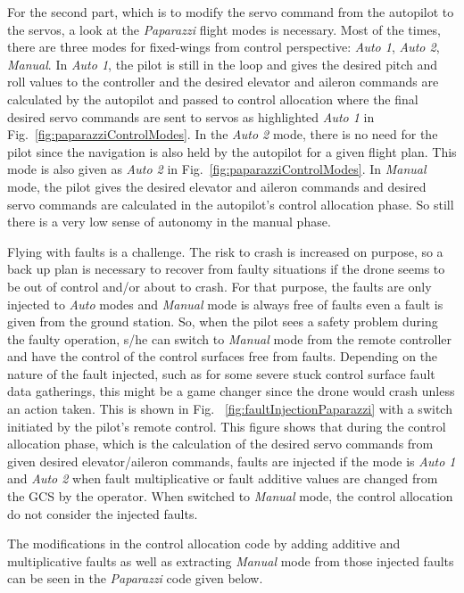 For the second part, which is to modify the servo command from the autopilot to the servos, a look at the \emph{Paparazzi} flight modes is necessary. 
Most of the times, there are three modes for fixed-wings from control perspective:  \emph{Auto 1},  \emph{Auto 2},  \emph{Manual}. 
In  \emph{Auto 1}, the pilot is still in the loop and gives the desired pitch and roll values to the controller and the desired elevator and aileron commands are calculated by the autopilot and passed to control allocation where the final desired servo commands are sent to servos as highlighted  \emph{Auto 1} in Fig.~\ref{fig:paparazziControlModes}. 
In the  \emph{Auto 2} mode, there is no need for the pilot since the navigation is also held by the autopilot for a given flight plan. 
This mode is also given as  \emph{Auto 2} in Fig.~\ref{fig:paparazziControlModes}.
In  \emph{Manual} mode, the pilot gives the desired elevator and aileron commands and desired servo commands are calculated in the autopilot's control allocation phase. So still there is a very low sense of autonomy in the manual phase. 

Flying with faults is a challenge. 
The risk to crash is increased on purpose, so a back up plan is necessary to recover from faulty situations if the drone seems to be out of control and/or about to crash. 
For that purpose, the faults are only injected to \emph{Auto} modes and \emph{Manual} mode is always free of faults even a fault is given from the ground station. 
So, when the pilot sees a safety problem during the faulty operation, s/he can switch to \emph{Manual} mode from the remote controller and have the control of the control surfaces free from faults. 
Depending on the nature of the fault injected, such as for some severe stuck control surface fault data gatherings, this might be a game changer since the drone would crash unless an action taken.  
This is shown in Fig. ~\ref{fig:faultInjectionPaparazzi} with a switch initiated by the pilot's remote control. 
This figure shows that during the control allocation phase, which is the calculation of the desired servo commands from given desired elevator/aileron commands, faults are injected if the mode is \emph{Auto 1} and \emph{Auto 2} when fault multiplicative or fault additive values are changed from the GCS by the operator.  When switched to \emph{Manual} mode, the control allocation do not consider the injected faults. 

The modifications in the control allocation code by adding additive and multiplicative faults as well as extracting  \emph{Manual} mode from those injected faults can be seen in the \emph{Paparazzi} code given below. 


